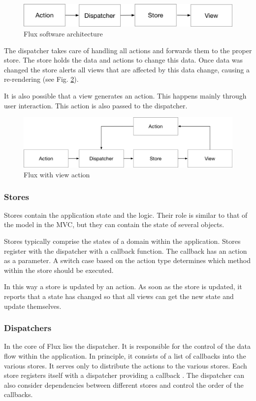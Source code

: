 \begin{figure}[H]
	\centering
	\includegraphics[scale=0.5]{bilder/grundlagen/UniDirection.png}
	\caption{Flux software architecture \cite{Flux}}
	\label{fig:FLUX}
\end{figure}

The dispatcher takes care of handling all actions and forwards them to the proper store.
The store holds the data and actions to change this data.
Once data was changed the store alerts all views that are affected by this data change, causing a re-rendering (see Fig. \ref{fig:FA}).

It is also possible that a view generates an action. This happens mainly through user interaction. This action is also passed to the dispatcher.

\begin{figure}[H]
	\centering
	\includegraphics[scale=0.5]{bilder/grundlagen/uniDirection2.png}
	\caption{Flux with view action \cite{Flux}}
	\label{fig:FA}
\end{figure}

\subsubsection{Stores}
Stores contain the application state and the logic. 
Their role is similar to that of the model in the MVC,
but they can contain the state of several objects. 

Stores typically comprise the states of a domain within the application.
Stores register with the dispatcher with a callback function.
The callback has an action as a parameter.
A switch case based on the action type determines which method within the store should be executed.

In this way a store is updated by an action. As soon as the store is updated,
it reports that a state has changed so that all views can get the new state and update themselves.

\subsubsection{Dispatchers}
In the core of Flux lies the dispatcher. It is responsible for the control of the data flow within the application. In principle, it consists of a list of callbacks into the various stores.  It serves only to distribute the actions to the various stores. Each store registers itself with a dispatcher providing a callback . The dispatcher can also consider dependencies between different stores and control the order of the callbacks.

